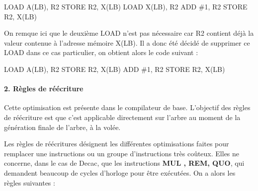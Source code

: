 \documentclass[
]{article}
\newenvironment{Shaded}{}{}
\newcommand{\NormalTok}[1]{#1}
\begin{document}
\begin{Shaded}
\begin{Highlighting}[]
\NormalTok{LOAD A(LB), R2}
\NormalTok{STORE R2, X(LB)}
\NormalTok{LOAD X(LB), R2}
\NormalTok{ADD \#1, R2}
\NormalTok{STORE R2, X(LB)}
\end{Highlighting}
\end{Shaded}

On remque ici que le deuxième LOAD n'est pas nécessaire car R2 contient
déjà la valeur contenue à l'adresse mémoire X(LB). Il a donc été décidé
de supprimer ce LOAD dans ce cas particulier, on obtient alors le code
suivant :

\begin{Shaded}
\begin{Highlighting}[]
\NormalTok{LOAD A(LB), R2}
\NormalTok{STORE R2, X(LB)}
\NormalTok{ADD \#1, R2}
\NormalTok{STORE R2, X(LB)}
\end{Highlighting}
\end{Shaded}

\hypertarget{2-ruxe8gles-de-ruxe9uxe9criture}{%
\paragraph{\texorpdfstring{2. Règles de réécriture
}{2. Règles de réécriture }}\label{2-ruxe8gles-de-ruxe9uxe9criture}}

Cette optimisation est présente dans le compilateur de base. L'objectif
des règles de réécriture est que c'est applicable directement sur
l'arbre au moment de la génération finale de l'arbre, à la volée.

Les règles de réécritures désignent les différentes optimisations faites
pour remplacer une instructions ou un groupe d'instructions très
coûteux. Elles ne concerne, dans le cas de Decac, que les instructions
\textbf{MUL , REM, QUO}, qui demandent beaucoup de cycles d'horloge pour
être exécutées. On a alors les règles suivantes :
\end{document}
